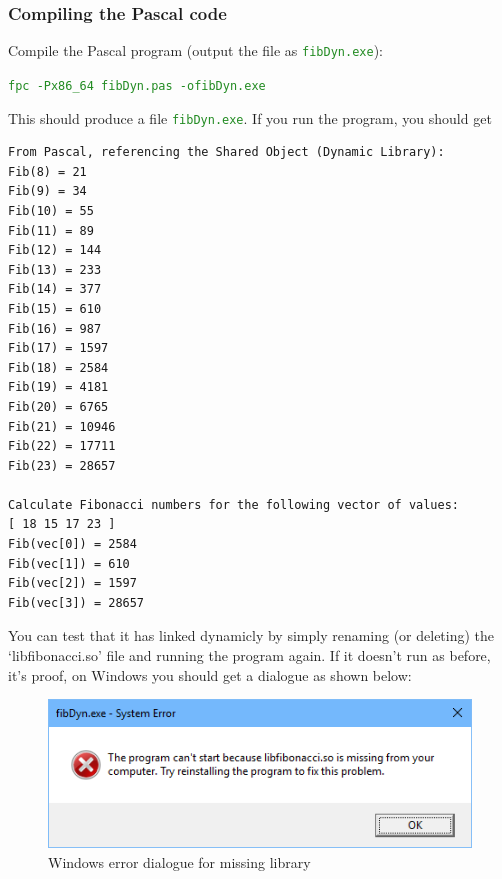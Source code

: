 \documentclass[10pt,a4paper]{article}
\newcommand{\mytext}[1]{\textcolor{ForestGreen}{\texttt{#1}}}
\begin{document}
\clearpage
\subsubsection*{Compiling the Pascal code}
Compile the Pascal program (output the file as \mytext{fibDyn.exe}):

\mytext{fpc -Px86\_64 fibDyn.pas -ofibDyn.exe}

This should produce a file \mytext{fibDyn.exe}. If you run the program,
you should get

\lstset{style=myBash}
\begin{lstlisting}
From Pascal, referencing the Shared Object (Dynamic Library):
Fib(8) = 21
Fib(9) = 34
Fib(10) = 55
Fib(11) = 89
Fib(12) = 144
Fib(13) = 233
Fib(14) = 377
Fib(15) = 610
Fib(16) = 987
Fib(17) = 1597
Fib(18) = 2584
Fib(19) = 4181
Fib(20) = 6765
Fib(21) = 10946
Fib(22) = 17711
Fib(23) = 28657

Calculate Fibonacci numbers for the following vector of values:
[ 18 15 17 23 ]
Fib(vec[0]) = 2584
Fib(vec[1]) = 610
Fib(vec[2]) = 1597
Fib(vec[3]) = 28657
\end{lstlisting}

You can test that it has linked dynamicly
by simply renaming (or deleting) the `libfibonacci.so'
file and running the program again. If it doesn't run as before, it's proof, on Windows
you should get a dialogue as shown below:

\begin{figure}[hbtp]
\centering
\includegraphics[scale=1]{../fibonacci/fibDynSystemError.png}
\caption{Windows error dialogue for missing library}
\end{figure}
\end{document}
